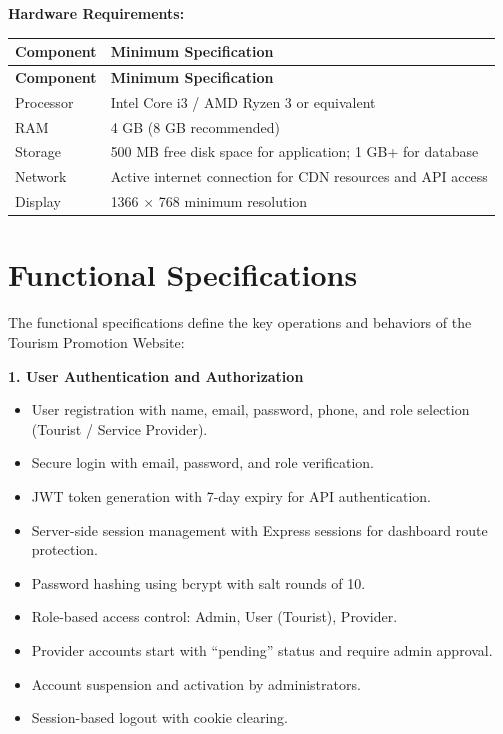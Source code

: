 \textbf{Hardware Requirements:}

\begin{longtable}{|p{4cm}|p{9cm}|}
\hline
\textbf{Component} & \textbf{Minimum Specification} \\
\hline
\endfirsthead
\hline
\textbf{Component} & \textbf{Minimum Specification} \\
\hline
\endhead
Processor & Intel Core i3 / AMD Ryzen 3 or equivalent \\
\hline
RAM & 4 GB (8 GB recommended) \\
\hline
Storage & 500 MB free disk space for application; 1 GB+ for database \\
\hline
Network & Active internet connection for CDN resources and API access \\
\hline
Display & 1366 $\times$ 768 minimum resolution \\
\hline
\end{longtable}

\section{Functional Specifications}

The functional specifications define the key operations and behaviors of the Tourism Promotion Website:

\textbf{1. User Authentication and Authorization}
\begin{itemize}[leftmargin=2em]
    \item User registration with name, email, password, phone, and role selection (Tourist / Service Provider).
    \item Secure login with email, password, and role verification.
    \item JWT token generation with 7-day expiry for API authentication.
    \item Server-side session management with Express sessions for dashboard route protection.
    \item Password hashing using bcrypt with salt rounds of 10.
    \item Role-based access control: Admin, User (Tourist), Provider.
    \item Provider accounts start with ``pending'' status and require admin approval.
    \item Account suspension and activation by administrators.
    \item Session-based logout with cookie clearing.
\end{itemize}

